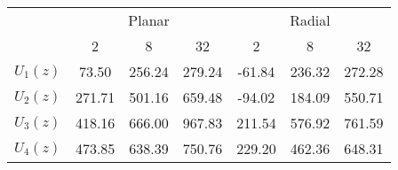 \begin{tabular}{lcccccc}
\toprule
{} & \multicolumn{3}{c}{Planar} & \multicolumn{3}{c}{Radial} \\
{} &     2  &     8  &     32 &     2  &     8  &     32 \\
\midrule
$U_1(z)$ &  73.50 & 256.24 & 279.24 & -61.84 & 236.32 & 272.28 \\
$U_2(z)$ & 271.71 & 501.16 & 659.48 & -94.02 & 184.09 & 550.71 \\
$U_3(z)$ & 418.16 & 666.00 & 967.83 & 211.54 & 576.92 & 761.59 \\
$U_4(z)$ & 473.85 & 638.39 & 750.76 & 229.20 & 462.36 & 648.31 \\
\bottomrule
\end{tabular}
